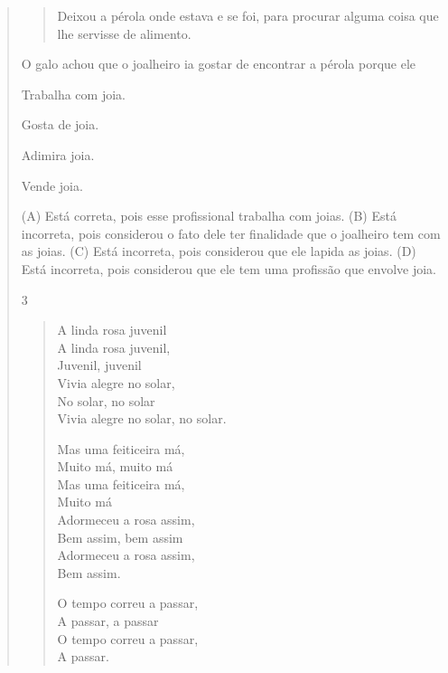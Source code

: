 \begin{verse}
\begin{quote}
Deixou a pérola onde estava e se foi, para procurar
alguma coisa que lhe servisse de alimento.
\end{quote}


O galo achou que o joalheiro ia gostar de encontrar a pérola porque ele

\begin{escolha}
\item Trabalha com joia.

\item Gosta de joia.

\item Adimira joia.

\item Vende joia.
\end{escolha}


(A) Está correta, pois esse profissional trabalha com joias.
(B) Está incorreta, pois considerou o fato dele ter finalidade que o
joalheiro tem com as joias.
(C) Está incorreta, pois considerou que ele lapida as joias.
(D) Está incorreta, pois considerou que ele tem uma profissão que
envolve joia.

\num{3}

\begin{verse}
A linda rosa juvenil\\
A linda rosa juvenil,\\
Juvenil, juvenil\\
Vivia alegre no solar,\\
No solar, no solar\\
Vivia alegre no solar, no solar.

Mas uma feiticeira má,\\
Muito má, muito má\\
Mas uma feiticeira má,\\
Muito má\\
Adormeceu a rosa assim,\\
Bem assim, bem assim\\
Adormeceu a rosa assim,\\
Bem assim.

O tempo correu a passar,\\
A passar, a passar\\
O tempo correu a passar,\\
A passar.


\end{verse}
\end{verse}
